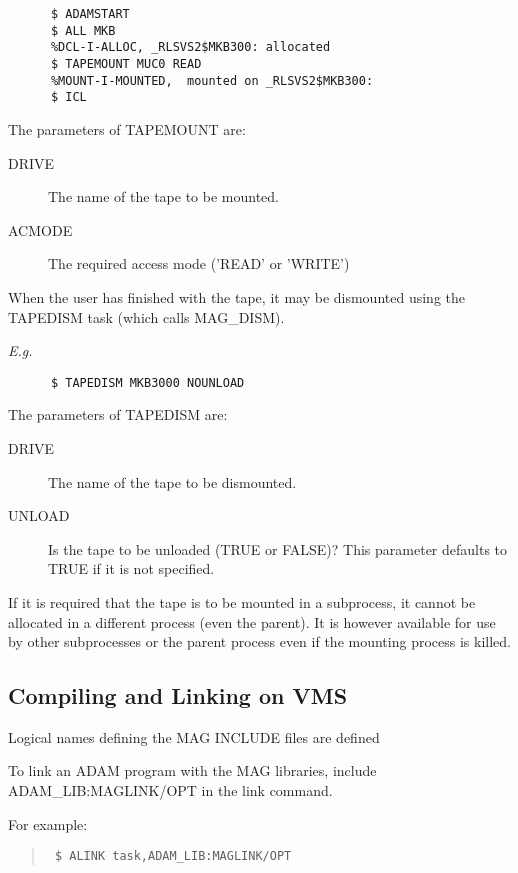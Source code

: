 \small
\begin{verbatim}
      $ ADAMSTART
      $ ALL MKB
      %DCL-I-ALLOC, _RLSVS2$MKB300: allocated
      $ TAPEMOUNT MUC0 READ
      %MOUNT-I-MOUNTED,  mounted on _RLSVS2$MKB300:
      $ ICL
\end{verbatim}
\normalsize

The parameters of TAPEMOUNT are:
\begin{description}
\item[DRIVE] \hspace{5mm} The name of the tape to be mounted.
\item[ACMODE] \hspace{5mm} The required access mode ('READ' or 'WRITE')
\end{description}

When the user has finished with the tape, it may be dismounted using the 
TAPEDISM task (which calls MAG\_DISM).

{\em E.g.}
\small
\begin{verbatim}
      $ TAPEDISM MKB3000 NOUNLOAD
\end{verbatim}
\normalsize

The parameters of TAPEDISM are:
\begin{description}
\item[DRIVE] \hspace{5mm} The name of the tape to be dismounted.
\item[UNLOAD] Is the tape to be unloaded (TRUE or FALSE)? This parameter
defaults to TRUE if it is not specified.
\end{description}

If it is required that the tape is to be mounted in a subprocess, it
cannot be allocated in a different process (even the parent). It is
however available for use by other subprocesses or the parent process
even if the mounting process is killed.

\subsection{Compiling and Linking on VMS}

Logical names defining the MAG INCLUDE files are defined 

To link an ADAM program with the MAG libraries, include ADAM\_LIB:MAGLINK/OPT
in the link command.

For example:

\begin{quote}{\tt
\$ ALINK task,ADAM\_LIB:MAGLINK/OPT
}
\end{quote}

